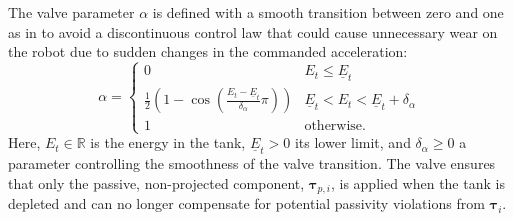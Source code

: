 \documentclass[../main.tex]{subfiles}
\begin{document}
The valve parameter $\alpha$ is defined with a smooth transition between zero and one as in \cite{shahriariValvebasedVirtualEnergy2018} to avoid a discontinuous control law that could cause unnecessary wear on the robot due to sudden changes in the commanded acceleration:
\begin{equation} \label{eq:alpha_i}
    \alpha = \begin{cases}
        0 & E_{t}\leq \underline{E}_{t} %
        \\
        \frac{1}{2}\left( 1-\cos\left( \frac{E_{t}-\underline{E}_{t}}{\delta_{\alpha}} \pi \right) \right) & \underline{E}_{t} < E_{t}<\underline{E}_{t} + \delta_{\alpha}  \\
        1  & \text{otherwise}.
        \end{cases}
\end{equation}
Here, $E_t \in \mathbb{R}$ is the energy in the tank, $\underline{E}_t > 0$ its lower limit, and $\delta_\alpha \geq 0$ a parameter controlling the smoothness of the valve transition. The valve ensures that only the passive, non-projected component, $\bm{\tau}_{p,i}$, is applied when the tank is depleted and can no longer compensate for potential passivity violations from $\bm{\tau}_i$.
\end{document}
